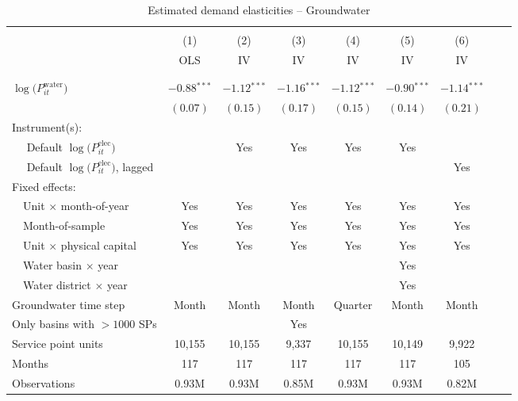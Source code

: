 \begin{table}[t!]\centering
\small
\caption{Estimated demand elasticities -- Groundwater  \label{tab:water_regs_combined}}
\vspace{-0.1cm}
\small
\begin{adjustbox}{center} 
\begin{tabular}{lcccccccc} 
\hline \hline
\vspace{-0.37cm}
\\
 & (1)  & (2)  & (3)  & (4)  & (5)  & (6) \\ 
[0.1em]
 & OLS & IV & IV & IV & IV & IV \\
\vspace{-0.37cm}
\\
\cline{2-7}
\vspace{-0.27cm}
\\
 $\log\big(P^{\text{water}}_{it}\big)$ ~ & 
 $-0.88$$^{***}$  & $-1.12$$^{***}$ & $-1.16$$^{***}$ & $-1.12$$^{***}$ & $-0.90$$^{***}$  & $-1.14$$^{***}$ \\ 
& $(0.07)$ & $(0.15)$ & $(0.17)$ & $(0.15)$ & $(0.14)$ & $(0.21)$ \\
[1.5em] 
Instrument(s): \\
[0.1em] 
~~ Default $\log\big(P^{\text{elec}}_{it}\big)$  &  & Yes & Yes  & Yes  & Yes & \\
[0.1em] 
~~ Default $\log\big(P^{\text{elec}}_{it}\big)$, lagged  & & &  &  & & Yes \\
[1.5em] 
Fixed effects: \\
[0.1em] 
~~Unit $\times$ month-of-year  & Yes  & Yes  & Yes  & Yes  & Yes  & Yes   \\ 
[0.1em] 
~~Month-of-sample  & Yes  & Yes  & Yes  & Yes  & Yes  & Yes   \\ 
[0.1em] 
~~Unit $\times$ physical capital & Yes & Yes & Yes & Yes & Yes & Yes  \\
[0.1em] 
~~Water basin $\times$ year & & &  & & Yes &   \\
[0.1em] 
~~Water district $\times$ year & & & & & Yes &  \\
[1.5em] 
Groundwater time step & Month & Month & Month & Quarter & Month & Month  \\ 
[0.1em] 
Only basins with $>1000$ SPs &  &  & Yes &  &  &   \\ 
[1.5em] 
Service point units & 10,155 & 10,155 & 9,337 & 10,155 & 10,149 & 9,922  \\ 
[0.1em] 
Months  & 117 & 117 & 117 & 117 & 117 & 105 \\ 
[0.1em] 
Observations & 0.93M & 0.93M & 0.85M & 0.93M & 0.93M & 0.82M \\ 

\end{tabular}
\end{adjustbox}
\end{table}
